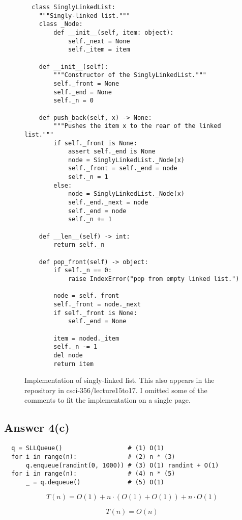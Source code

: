 \documentclass{article}
\begin{document}
\begin{enumerate}[label=(\alph*)]
\begin{figure}
\begin{verbatim}
  class SinglyLinkedList:
    """Singly-linked list."""
    class _Node:
        def __init__(self, item: object):
            self._next = None
            self._item = item
     
    def __init__(self):
        """Constructor of the SinglyLinkedList."""
        self._front = None
        self._end = None
        self._n = 0

    def push_back(self, x) -> None:
        """Pushes the item x to the rear of the linked list."""
        if self._front is None:
            assert self._end is None
            node = SinglyLinkedList._Node(x)
            self._front = self._end = node
            self._n = 1
        else:
            node = SinglyLinkedList._Node(x)
            self._end._next = node
            self._end = node
            self._n += 1

    def __len__(self) -> int:
        return self._n

    def pop_front(self) -> object:
        if self._n == 0:
            raise IndexError("pop from empty linked list.")

        node = self._front
        self._front = node._next
        if self._front is None:
            self._end = None

        item = noded._item
        self._n -= 1
        del node
        return item
\end{verbatim}
\caption{Implementation of singly-linked list. This also appears in
  the repository in csci-356/lecture15to17. I omitted some of the comments
  to fit the implementation on a single page.}\label{fig:sll}

\end{figure}

\subsection*{Answer 4(c)}
\begin{verbatim}
  q = SLLQueue()                  # (1) O(1)
  for i in range(n):              # (2) n * (3)
      q.enqueue(randint(0, 1000)) # (3) O(1) randint + O(1)
  for i in range(n):              # (4) n * (5)
      _ = q.dequeue()             # (5) O(1)
\end{verbatim}

\begin{equation*}
  T(n) = O(1) + n \cdot (O(1) + O(1)) + n \cdot O(1)
\end{equation*}

\begin{equation*}
  \boxed{T(n) = O(n)}
\end{equation*}

\end{enumerate}
\end{document}
